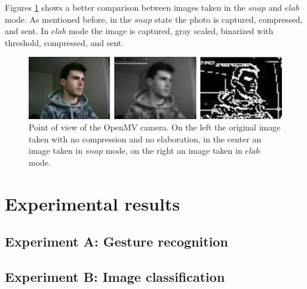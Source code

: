 \documentclass[12pt]{report}
\begin{document}
Figures \ref{fig:openmv_pov} shows a better comparison between images taken in the $snap$ and $elab$ mode. As mentioned before, in the $snap$ state the photo is captured, compressed, and sent. In $elab$ mode the image is captured, gray scaled, binarized with threshold, compressed, and sent.

\begin{figure}[h!]
    \centering
    \includegraphics[width=140mm]{Figures/Chapter4/openmv_pov.jpg} 
    \caption{Point of view of the OpenMV camera. On the left the original image taken with no compression and no elaboration, in the center an image taken in $snap$ mode, on the right an image taken in $elab$ mode.}
    \label{fig:openmv_pov}    
\end{figure}


\chapter{Experimental results} 

\section{Experiment A: Gesture recognition}

\section{Experiment B: Image classification}
\end{document}
